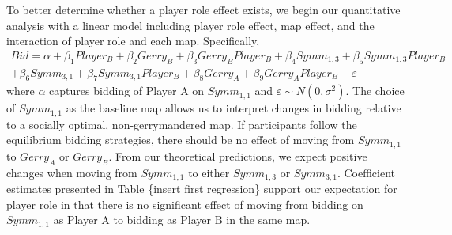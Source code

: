 \documentclass[AER]{AEA}
\begin{document}
To better determine whether a player role effect exists, we begin our quantitative analysis with a linear model including player role effect, map effect, and the interaction of player role and each map. Specifically,
\begin{multline}\label{model_1}
Bid = \alpha + \beta_1 Player_B + \beta_2 Gerry_B + \beta_3 Gerry_B Player_B + \beta_4 Symm_{1,3} + \beta_5 Symm_{1,3} Player_B \\ + \beta_6 Symm_{3,1} + \beta_7 Symm_{3,1} Player_B + \beta_8 Gerry_A + \beta_9 Gerry_A Player_B + \varepsilon
\end{multline}
where $\alpha$ captures bidding of Player A on $Symm_{1,1}$ and $\varepsilon \sim N(0, \sigma^2)$. The choice of $Symm_{1,1}$ as the baseline map allows us to interpret changes in bidding relative to a socially optimal, non-gerrymandered map. If participants follow the equilibrium bidding strategies, there should be no effect of moving from $Symm_{1,1}$ to $Gerry_{A}$ or $Gerry_{B}$. From our theoretical predictions, we expect positive changes when moving from $Symm_{1,1}$ to either $Symm_{1,3}$ or $Symm_{3,1}$. Coefficient estimates presented in Table \{insert first regression\} support our expectation for player role in that there is no significant effect of moving from bidding on $Symm_{1,1}$ as Player A to bidding as Player B in the same map. 
\end{document}

